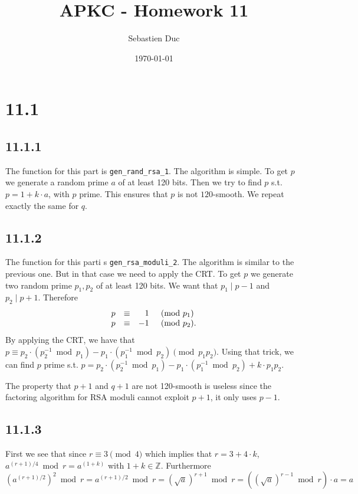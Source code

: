 \documentclass[12pt,a4paper]{article}
\title{APKC - Homework 11}
\author{Sebastien Duc}
\date{\today}
\begin{document}
    \section{11.1}
    \subsection{11.1.1}
        The function for this part is \texttt{gen\_rand\_rsa\_1}. The algorithm is simple.
        To get $p$ we generate a random prime $a$ of at least 120 bits. Then we try to find $p$ s.t.
        $p = 1 + k \cdot a$, with $p$ prime. This ensures that $p$ is not $120$-smooth.
        We repeat exactly the same for $q$.
    \subsection{11.1.2}
        The function for this parti s \texttt{gen\_rsa\_moduli\_2}. The algorithm is similar to the previous one.
        But in that case we need to apply the CRT. To get $p$ we generate two random prime $p_1,p_2$ of at least 120 bits.
        We want that $p_1 \mid p-1$ and $p_2 \mid p+1$. Therefore
        \[
            \begin{array}{l l r l}
                p &\equiv & 1 &\pmod{p_1}\\
                p &\equiv &-1 & \pmod{p_2}.\\
            \end{array}
        \]
        By applying the CRT, we have that $p \equiv p_2\cdot (p_2^{-1} \bmod p_1) - p_1 \cdot (p_1^{-1} \bmod p_2) \pmod{p_1p_2}$.
        Using that trick, we can find $p$ prime s.t. $p = p_2\cdot (p_2^{-1} \bmod p_1) - p_1 \cdot (p_1^{-1} \bmod p_2) + k\cdot p_1p_2$.

        The property that $p+1$ and $q+1$ are not 120-smooth is useless since the factoring algorithm for RSA moduli cannot exploit $p+1$, it only uses $p-1$.
    \subsection{11.1.3}
        First we see that since $r \equiv 3 \pmod 4$ which implies that $r = 3 + 4 \cdot k$, $a^{(r+1)/4} \bmod r = a^{(1 + k)}$ with $1+k \in \mathbb{Z}$.
        Furthermore
        \[
            \left(a^{(r+1)/2}\right)^2 \bmod r = a^{(r+1)/2} \bmod r = (\sqrt{a})^{r+1} \bmod r = ((\sqrt{a})^{r-1}\bmod r) \cdot a = a
        \]
\end{document}
